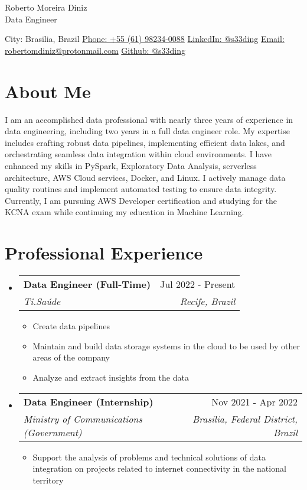 \documentclass[letterpaper,11pt]{article}%
\makeatletter
\newcommand{\resumeItem}[1]{\item{#1 \vspace{-3pt}}}%
\newcommand{\resumeSubheading}[4]{\vspace{-1pt}\item\begin{tabular*}{0.97\textwidth}[t]{l@{\extracolsep{\fill}}r}\textbf{#1} & #2 \\\textit{\small #3} & \textit{\small #4} \\\end{tabular*}\vspace{-8pt}}%
\newcommand{\resumeSubHeadingListStart}{\begin{itemize}[leftmargin=0.15in, label={}, itemsep=0pt, parsep=0pt]}%
\newcommand{\resumeSubHeadingListEnd}{\end{itemize}}%
\newcommand{\resumeItemListStart}{\begin{itemize}[itemsep=0pt, parsep=0pt]}%
\newcommand{\resumeItemListEnd}{\end{itemize}\vspace{-1pt}}%
\makeatother
\begin{document}
%
\normalsize%
\section*{}%
\label{sec:}%
\begin{center}%
{\LARGE Roberto Moreira Diniz} \\ \vspace{5pt}%
{\large Data Engineer} \\ \vspace{5pt}%
\end{center}%
\begin{center}%
City: Brasilia, Brazil \quad \textbullet \quad \href{https://wa.me/qr/UYOUX2DZ7BYHI1}{Phone: +55 (61) 98234-0088} \quad \textbullet \quad \href{https://www.linkedin.com/in/s33ding/}{LinkedIn: @s33ding} \quad \textbullet \quad \href{mailto:robertomdiniz@protonmail.com}{Email: robertomdiniz@protonmail.com} \quad \textbullet \quad \href{https://github.com/s33ding}{Github: @s33ding}%
\end{center}

%
\section*{About Me}%
\label{sec:AboutMe}%
I am an accomplished data professional with nearly three years of experience in data engineering, including two years in a full data engineer role. My expertise includes crafting robust data pipelines, implementing efficient data lakes, and orchestrating seamless data integration within cloud environments. I have enhanced my skills in PySpark, Exploratory Data Analysis, serverless architecture, AWS Cloud services, Docker, and Linux. I actively manage data quality routines and implement automated testing to ensure data integrity. Currently, I am pursuing AWS Developer certification and studying for the KCNA exam while continuing my education in Machine Learning.

%
\section*{Professional Experience}%
\label{sec:ProfessionalExperience}%
\resumeSubHeadingListStart%
\resumeSubheading{Data Engineer (Full-Time)}{Jul 2022 - Present}{Ti.Saúde}{Recife, Brazil}%
\resumeItemListStart%
\resumeItem{Create data pipelines}%
\resumeItem{Maintain and build data storage systems in the cloud to be used by other areas of the company}%
\resumeItem{Analyze and extract insights from the data}%
\resumeItemListEnd%
\resumeSubheading{Data Engineer (Internship)}{Nov 2021 - Apr 2022}{Ministry of Communications (Government)}{Brasilia, Federal District, Brazil}%
\resumeItemListStart%
\resumeItem{Support the analysis of problems and technical solutions of data integration on projects related to internet connectivity in the national territory}%
\resumeItemListEnd%
\resumeSubHeadingListEnd
\end{document}
